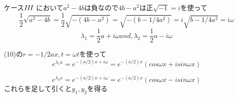 \documentclass[uplatex]{jsarticle}
\begin{document}
    ケース$I\hspace{-.1em}I\hspace{-.1em}I $ において$ a^2 -4b $は負なので$4b-a^2$は正$ \sqrt{-1} = i$を使って
    $$ \frac{1}{2}\sqrt{a^2-4b} = \frac{1}{2}\sqrt{-(4b-a^2)} = \sqrt{-(b-1/4a^2)} = i \sqrt{b-1/4a^2} = i \omega $$
    $$ \lambda_1 = \frac{1}{2}a + i \omega and, \lambda_2 = \frac{1}{2}a - i \omega $$

    (10)の$r=-1/2ax, t= \omega t $を使って
    $$ {e}^{\lambda_1 x} = {e}^{-(a/2)x + i \omega}={e}^{-(a/2)x}(cos \omega x + i sin \omega x) $$

    $$ {e}^{\lambda_2 x} = {e}^{-(a/2)x + i \omega}={e}^{-(a/2)x}(cos \omega x - i sin \omega x) $$
    これらを足して引くと$ y_1, y_2 $を得る
\end{document}
